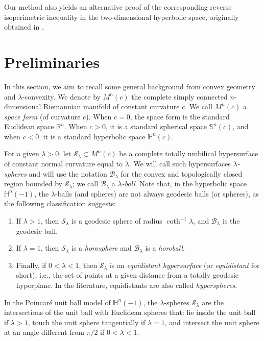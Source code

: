 \documentclass[12pt]{amsart}
\newcommand{\R}{\mathbb{R}}
\newcommand{\Hh}{\mathbb{H}}
\newcommand{\Ss}{\mathcal{S}}
\newcommand{\Bb}{\mathcal{B}}
\theoremstyle{theorem}
\theoremstyle{Intro}
\theoremstyle{definition}
\theoremstyle{remark}
\theoremstyle{claim}
\numberwithin{equation}{section}
\begin{document}
Our method also yields an alternative proof of the corresponding reverse isoperimetric inequality in the two-dimensional hyperbolic space, originally obtained in \cite{DrLob}.




\section{Preliminaries}


In this section, we aim to recall some general background from convex geometry and $\lambda$-convexity. We denote by $M^n(c)$ the complete simply connected $n$-dimensional Riemannian manifold of constant curvature $c$. We call $M^n(c)$ a \emph{space form} (of curvature $c$). When $c=0$, the space form is the standard Euclidean space $\R^n$. When $c > 0$, it is a standard spherical space $\mathbb S^n(c)$, and when $c < 0$, it is a standard hyperbolic space $\Hh^n(c)$.


For a given $\lambda > 0$, let $\Ss_\lambda \subset M^n(c)$ be a complete totally umbilical hypersurface of constant normal curvature equal to $\lambda$. We will call such hypersurfaces \emph{$\lambda$-spheres} and will use the notation $\Bb_\lambda$ for the convex and topologically closed region bounded by $\Ss_\lambda$; we call $\Bb_\lambda$ a \emph{$\lambda$-ball}. Note that, in the hyperbolic space $\Hh^n(-1)$, the $\lambda$-balls (and spheres) are not always geodesic balls (or spheres), as the following classification suggests:

\begin{enumerate}
\item
If $\lambda > 1$, then $\Ss_\lambda$ is a geodesic sphere of radius $\coth^{-1} \lambda$, and $\Bb_\lambda$ is the geodesic ball. 
\item
If $\lambda = 1$, then $\Ss_\lambda$ is a \emph{horosphere} and $\Bb_\lambda$ is a \emph{horoball}. 
\item
\label{It:Horo}
Finally, if $0<\lambda < 1$, then $\Ss_\lambda$ is an \emph{equidistant hypersurface} (or \emph{equidistant} for short), i.e., the set of points at a given distance from a totally geodesic hyperplane. In the literature, equidistants are also called \emph{hyperspheres}. 
\end{enumerate}

In the Poincar\'e unit ball model of $\Hh^n(-1)$, the $\lambda$-spheres $\Ss_\lambda$ are the intersections of the unit ball with Euclidean spheres that: lie inside the unit ball if $\lambda > 1$, touch the unit sphere tangentially if $\lambda = 1$, and intersect the unit sphere at an angle different from $\pi/2$ if $0<
\lambda < 1$. 
\end{document}
